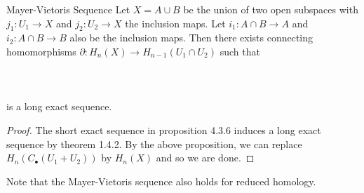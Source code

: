\documentclass[a4paper]{article}
\begin{document}
\begin{thm}{Mayer-Vietoris Sequence}{} Let $X=A\cup B$ be the union of two open subspaces with $j_1:U_1\to X$ and $j_2:U_2\to X$ the inclusion maps. Let $i_1:A\cap B\to A$ and $i_2:A\cap B\to B$ also be the inclusion maps. Then there exists connecting homomorphisms $\partial:H_n(X)\to H_{n-1}(U_1\cap U_2)$ such that \\~\\
\\~\\
is a long exact sequence. \tcbline
\begin{proof}
The short exact sequence in proposition 4.3.6 induces a long exact sequence by theorem 1.4.2. By the above proposition, we can replace $H_n(C_\bullet(U_1+U_2))$ by $H_n(X)$ and so we are done. 
\end{proof}
\end{thm}

Note that the Mayer-Vietoris sequence also holds for reduced homology. 
\end{document}
